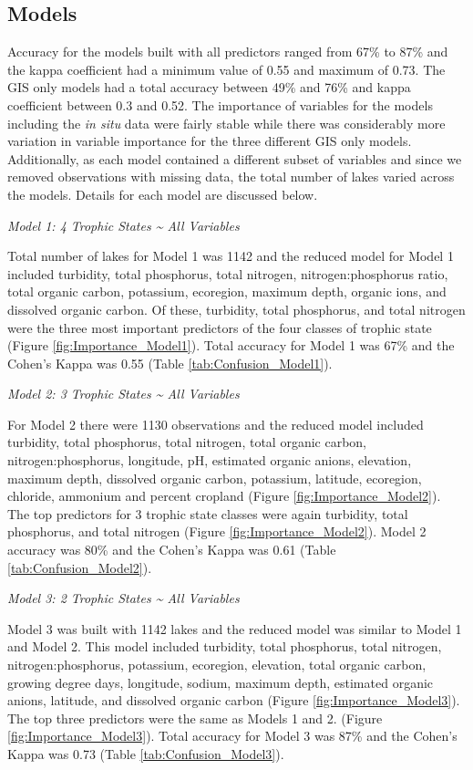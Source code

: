 \documentclass[11pt,]{article}
\begin{document}
\subsection{Models}\label{models}

Accuracy for the models built with all predictors ranged from 67\% to
87\% and the kappa coefficient had a minimum value of 0.55 and maximum
of 0.73. The GIS only models had a total accuracy between 49\% and 76\%
and kappa coefficient between 0.3 and 0.52. The importance of variables
for the models including the \emph{in situ} data were fairly stable
while there was considerably more variation in variable importance for
the three different GIS only models. Additionally, as each model
contained a different subset of variables and since we removed
observations with missing data, the total number of lakes varied across
the models. Details for each model are discussed below.

\emph{Model 1: 4 Trophic States \textasciitilde{} All Variables}

Total number of lakes for Model 1 was 1142 and the reduced model for
Model 1 included turbidity, total phosphorus, total nitrogen,
nitrogen:phosphorus ratio, total organic carbon, potassium, ecoregion,
maximum depth, organic ions, and dissolved organic carbon. Of these,
turbidity, total phosphorus, and total nitrogen were the three most
important predictors of the four classes of trophic state (Figure
\ref{fig:Importance_Model1}). Total accuracy for Model 1 was 67\% and
the Cohen's Kappa was 0.55 (Table \ref{tab:Confusion_Model1}).

\emph{Model 2: 3 Trophic States \textasciitilde{} All Variables}

For Model 2 there were 1130 observations and the reduced model included
turbidity, total phosphorus, total nitrogen, total organic carbon,
nitrogen:phosphorus, longitude, pH, estimated organic anions, elevation,
maximum depth, dissolved organic carbon, potassium, latitude, ecoregion,
chloride, ammonium and percent cropland (Figure
\ref{fig:Importance_Model2}). The top predictors for 3 trophic state
classes were again turbidity, total phosphorus, and total nitrogen
(Figure \ref{fig:Importance_Model2}). Model 2 accuracy was 80\% and the
Cohen's Kappa was 0.61 (Table \ref{tab:Confusion_Model2}).

\emph{Model 3: 2 Trophic States \textasciitilde{} All Variables}

Model 3 was built with 1142 lakes and the reduced model was similar to
Model 1 and Model 2. This model included turbidity, total phosphorus,
total nitrogen, nitrogen:phosphorus, potassium, ecoregion, elevation,
total organic carbon, growing degree days, longitude, sodium, maximum
depth, estimated organic anions, latitude, and dissolved organic carbon
(Figure \ref{fig:Importance_Model3}). The top three predictors were the
same as Models 1 and 2. (Figure \ref{fig:Importance_Model3}). Total
accuracy for Model 3 was 87\% and the Cohen's Kappa was 0.73 (Table
\ref{tab:Confusion_Model3}).
\end{document}

